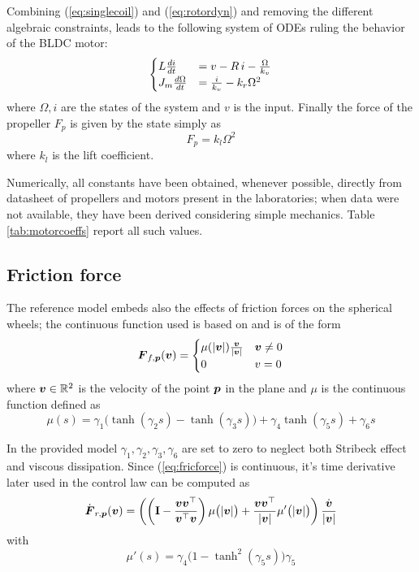 Combining (\ref{eq:singlecoil}) and (\ref{eq:rotordyn}) and removing the different algebraic constraints, leads to the following system of ODEs ruling the behavior of the BLDC motor:
\begin{equation} \label{eq:motordynamics}
\begin{cases}
    L \diff{i} t & = v - R \, i - \frac{\Omega}{k_{v}} \\
    J_{m} \diff{\Omega}t & = \frac{i}{k_{v}} - k_{r} \Omega^{2}
\end{cases}
\end{equation}
where $\Omega, i$ are the states of the system and $v$ is the input. Finally the force of the propeller $F_{p}$ is given by the state simply as
\begin{equation} \label{eq:motorforce}
    F_{p} = k_{l} \Omega^{2}
\end{equation}
where $k_{l}$ is the lift coefficient.

Numerically, all constants have been obtained, whenever possible, directly from datasheet of propellers and motors present in the laboratories; when data were not available, they have been derived considering simple mechanics. Table \ref{tab:motorcoeffs} report all such values.



\subsection{Friction force}
The reference model embeds also the effects of friction forces on the spherical wheels; the continuous function used is based on \cite{friction} and is of the form
\begin{equation} \label{eq:fricforce}
    \vett F_{f,\vett p}(\vett v) =
    \begin{cases}
        \mu(|\vett v|) \frac{\vett v}{|\vett v|} & \vett v \neq 0 \\
        0 & v = 0
    \end{cases}
\end{equation}
where $\boldsymbol{v} \in \mathbb R^{2}$ is the velocity of the point $\boldsymbol{p}$ in the plane and $\mu$ is the continuous function defined as
\[ \mu(s) = \gamma_{1}\big(\tanh(\gamma_{2}s) - \tanh(\gamma_{3} s)\big) + \gamma_{4} \tanh(\gamma_{5}s) + \gamma_{6} s \]

In the provided model $\gamma_{1}, \gamma_{2}, \gamma_{3}, \gamma_{6}$ are set to zero to neglect both Stribeck effect and viscous dissipation.
Since (\ref{eq:fricforce}) is continuous, it's time derivative later used in the control law can be computed as
\begin{equation} \label{eq:fricderivative}
    \dvett F_{r,\vett p}(\vett v) = \left(
        \left( \matt I  - \frac{\vett v \vett v^{\top}}{\vett v^{\top} \vett v} \right) \mu \big(|\vett v|\big)
        + \frac{\vett v \vett v^{\top}}{|\vett v|}\mu'\big(|\vett v|\big)
    \right) \frac{\dvett v}{|\vett v|}
\end{equation}
with
\begin{equation} \label{eq:mudt}
    \mu'(s) = \gamma_{4}\big(1 - \tanh^{2}(\gamma_{5}s) \big) \gamma_{5}
\end{equation}


